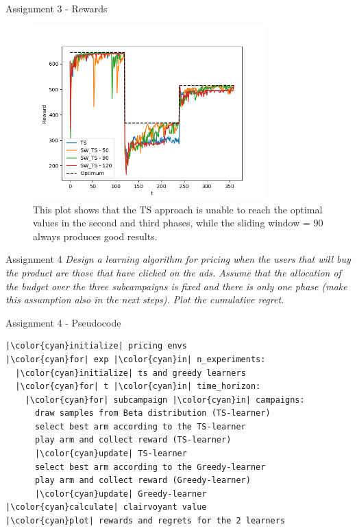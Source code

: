 \documentclass[11pt]{beamer}
\begin{document}
\begin{frame}{Assignment 3 - Rewards}
\begin{figure}[hbtp]
\centering
\includegraphics[width=0.8\textwidth]{images/assignment_3_exp_1_cum_reward.png}
\caption{This plot shows that the TS approach is unable to reach the optimal values in the second and third phases, while the sliding window = 90 always produces good results.}
\end{figure}
\end{frame}

\begin{frame}{Assignment 4}
\textit{Design a learning algorithm for pricing when the users that will buy the product are those that have clicked on the ads. Assume that the allocation of the budget over the three subcampaigns is fixed and there is only one phase (make this assumption also in the next steps). Plot the cumulative regret.}
\end{frame}

\begin{frame}[fragile]{Assignment 4 - Pseudocode}
\begin{lstlisting}
|\color{cyan}initialize| pricing envs
|\color{cyan}for| exp |\color{cyan}in| n_experiments:
  |\color{cyan}initialize| ts and greedy learners 
  |\color{cyan}for| t |\color{cyan}in| time_horizon:
    |\color{cyan}for| subcampaign |\color{cyan}in| campaigns:
      draw samples from Beta distribution (TS-learner)
      select best arm according to the TS-learner
      play arm and collect reward (TS-learner)
      |\color{cyan}update| TS-learner
      select best arm according to the Greedy-learner
      play arm and collect reward (Greedy-learner)
      |\color{cyan}update| Greedy-learner
|\color{cyan}calculate| clairvoyant value
|\color{cyan}plot| rewards and regrets for the 2 learners
\end{lstlisting}
\end{frame}
\end{document}
